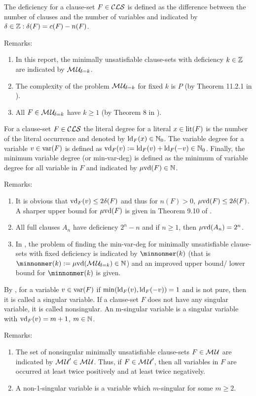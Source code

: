 \documentclass{report}
\begin{document}
\begin{defi}\label{def:deficiency}
The deficiency for a clause-set $F \in \mathcal{CLS}$ is defined as the difference between the number of clauses and the number of variables and indicated by $\delta \in \mathbb{Z}: \delta(F)= c(F) - n(F)$.
\end{defi}
Remarks:
  \begin{enumerate}
  \item In this report, the minimally unsatisfiable clause-sets with deficiency $k \in \mathbb{Z}$ are indicated by $\mathcal{M\hspace{0.8pt}U}_{\!\delta=k}$.
  \item The complexity of the problem $\mathcal{M\hspace{0.8pt}U}_{\!\delta=k}$ for fixed $k$ is $P$ (by Theorem 11.2.1 in \cite{h25}).
  \item All $F \in \mathcal{M\hspace{0.8pt}U}_{\!\delta=k}$ have $k \ge 1$ (by Theorem 8 in \cite{h32}).
  \end{enumerate}

\begin{defi}\label{def:degree}
For a clause-set $F \in \mathcal{CLS}$ the literal degree for a literal $x \in \operatorname{lit}(F)$ is the number of the literal occurrence and denoted by $\operatorname{ld}_F(x) \in \mathbb{N}_0$. The variable degree for a variable $v \in \operatorname{var}(F)$ is defined as $\operatorname{vd}_F(v) := \operatorname{ld}_F(v) + \operatorname{ld}_F(-v) \in \mathbb{N}_0$. Finally, the minimum variable degree (or min-var-deg) is defined as the minimum of variable degree for all variable in $F$ and indicated by $\operatorname{\mu\!\operatorname{vd}}(F) \in \mathbb{N}$.
\end{defi}
Remarks:
  \begin{enumerate}
  \item It is obvious that $\operatorname{vd}_F(v) \le 2 \delta(F)$ and thus for $n(F) >0$, $\operatorname{\mu\!\operatorname{vd}}(F) \le 2 \delta(F)$. A sharper upper bound for $\operatorname{\mu\!\operatorname{vd}}(F)$ is given in Theorem 9.10 of \cite{h9}.
  \item All full clauses $A_n$ have deficiency $2^n - n$ and if $n \ge 1$, then  $\operatorname{\mu\!\operatorname{vd}}(A_n) =2^n$.
  \item In \cite{h9}, the problem of finding the min-var-deg for minimally unsatisfiable clause-sets with fixed deficiency is indicated by $\minnonmer(k) $ (that is $\minnonmer(k)  :=  \minvdeg(\Musati{\delta=k}) \in \NN$) and an improved upper bound/ lower bound for $\minnonmer(k) $ is given.
    \end{enumerate}
    
\begin{defi}\label{def:singvar}
By \cite{h29}, for a variable $v \in \operatorname{var}(F)$ if $\min(\operatorname{ld}_F(v) ,\operatorname{ld}_F(-v))=1$ and is not pure, then it is called a singular variable. If a clause-set $F$ does not have any singular variable, it is called nonsingular. An m-singular variable is a singular variable with $\operatorname{vd}_F(v)=m+1$, $m \in \mathbb{N}$.
\end{defi}
Remarks:
  \begin{enumerate}
  \item The set of nonsingular minimally unsatisfiable clause-sets $F \in \mathcal{M\hspace{0.8pt}U}$ are indicated by $\mathcal{M\hspace{0.8pt}U}' \in \mathcal{M\hspace{0.8pt}U}$. Thus, if $F \in \mathcal{M\hspace{0.8pt}U}'$, then all variables in $F$ are occurred at least twice positively and at least twice negatively.
  \item A non-1-singular variable is a variable which $m$-singular for some $m \ge 2$.
   \end{enumerate}
 
\end{document}
